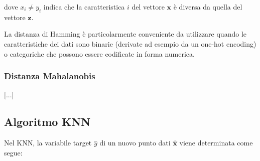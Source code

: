 dove $x_i \neq y_i$ indica che la caratteristica $i$ del vettore $\mathbf{x}$ è diversa da quella del vettore $\mathbf{z}$.

La distanza di Hamming è particolarmente conveniente da utilizzare quando le 
caratteristiche dei dati sono binarie (derivate ad esempio da un one-hot encoding) o categoriche 
che possono essere codificate in forma numerica.

\subsubsection{Distanza Mahalanobis}
[...]

\subsection{Algoritmo KNN}

Nel KNN, la variabile target \( \hat{y} \) di un nuovo punto dati \( \hat{\mathbf{x}} \) 
viene determinata come segue:

